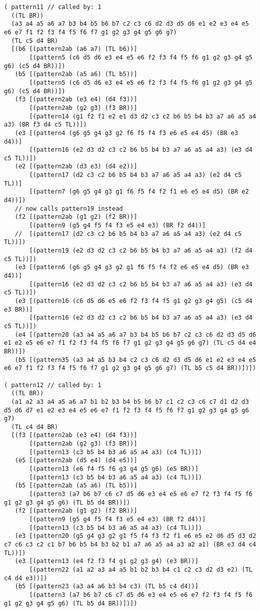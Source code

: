 {\begin{verbatim}
( pattern11 // called by: 1
  ((TL BR))
  (a3 a4 a5 a6 a7 b3 b4 b5 b6 b7 c2 c3 c6 d2 d3 d5 d6 e1 e2 e3 e4 e5 e6 e7 f1 f2 f3 f4 f5 f6 f7 g1 g2 g3 g4 g5 g6 g7)
  (TL c5 d4 BR)
  [(b6 [(pattern2ab (a6 a7) (TL b6))]
       [(pattern5 (c6 d5 d6 e3 e4 e5 e6 f2 f3 f4 f5 f6 g1 g2 g3 g4 g5 g6) (c5 d4 BR))])
   (b5 [(pattern2ab (a5 a6) (TL b5))]
       [(pattern5 (c6 d5 d6 e3 e4 e5 e6 f2 f3 f4 f5 f6 g1 g2 g3 g4 g5 g6) (c5 d4 BR))])
   (f3 [(pattern2ab (e3 e4) (d4 f3))]
       [(pattern2ab (g2 g3) (f3 BR))]
       [(pattern14 (g1 f2 f1 e2 e1 d3 d2 c3 c2 b6 b5 b4 b3 a7 a6 a5 a4 a3) (BR f3 d4 c5 TL))])
   (e3 [(pattern4 (g6 g5 g4 g3 g2 f6 f5 f4 f3 e6 e5 e4 d5) (BR e3 d4))]
       [(pattern16 (e2 d3 d2 c3 c2 b6 b5 b4 b3 a7 a6 a5 a4 a3) (e3 d4 c5 TL))])
   (e2 [(pattern2ab (d3 e3) (d4 e2))]
       [(pattern17 (d2 c3 c2 b6 b5 b4 b3 a7 a6 a5 a4 a3) (e2 d4 c5 TL))]
       [(pattern7 (g6 g5 g4 g3 g1 f6 f5 f4 f2 f1 e6 e5 e4 d5) (BR e2 d4))])
   // now calls pattern19 instead
   (f2 [(pattern2ab (g1 g2) (f2 BR))]
       [(pattern9 (g5 g4 f5 f4 f3 e5 e4 e3) (BR f2 d4))]
   //  [(pattern17 (d2 c3 c2 b6 b5 b4 b3 a7 a6 a5 a4 a3) (e2 d4 c5 TL))])
       [(pattern19 (e2 d3 d2 c3 c2 b6 b5 b4 b3 a7 a6 a5 a4 a3) (f2 d4 c5 TL))])
   (e3 [(pattern6 (g6 g5 g4 g3 g2 g1 f6 f5 f4 f2 e6 e5 e4 d5) (BR e3 d4))]
       [(pattern16 (e2 d3 d2 c3 c2 b6 b5 b4 b3 a7 a6 a5 a4 a3) (e3 d4 c5 TL))])
   (e3 [(pattern16 (c6 d5 d6 e5 e6 f2 f3 f4 f5 g1 g2 g3 g4 g5) (c5 d4 e3 BR))]
       [(pattern16 (e2 d3 d2 c3 c2 b6 b5 b4 b3 a7 a6 a5 a4 a3) (e3 d4 c5 TL))])
   (e4 [(pattern20 (a3 a4 a5 a6 a7 b3 b4 b5 b6 b7 c2 c3 c6 d2 d3 d5 d6 e1 e2 e5 e6 e7 f1 f2 f3 f4 f5 f6 f7 g1 g2 g3 g4 g5 g6 g7) (TL c5 d4 e4 BR))])
   (b5 [(pattern35 (a3 a4 a5 b3 b4 c2 c3 c6 d2 d3 d5 d6 e1 e2 e3 e4 e5 e6 e7 f1 f2 f3 f4 f5 f6 f7 g1 g2 g3 g4 g5 g6 g7) (TL b5 c5 d4 BR))])])

( pattern12 // called by: 1
  ((TL BR))
  (a1 a2 a3 a4 a5 a6 a7 b1 b2 b3 b4 b5 b6 b7 c1 c2 c3 c6 c7 d1 d2 d3 d5 d6 d7 e1 e2 e3 e4 e5 e6 e7 f1 f2 f3 f4 f5 f6 f7 g1 g2 g3 g4 g5 g6 g7)
  (TL c4 d4 BR)
  [(f3 [(pattern2ab (e3 e4) (d4 f3))]
       [(pattern2ab (g2 g3) (f3 BR))]
       [(pattern13 (c3 b5 b4 b3 a6 a5 a4 a3) (c4 TL))])
   (e5 [(pattern2ab (d5 e4) (d4 e5))]
       [(pattern13 (e6 f4 f5 f6 g3 g4 g5 g6) (e5 BR))]
       [(pattern13 (c3 b5 b4 b3 a6 a5 a4 a3) (c4 TL))])
   (b5 [(pattern2ab (a5 a6) (TL b5))]
       [(pattern3 (a7 b6 b7 c6 c7 d5 d6 e3 e4 e5 e6 e7 f2 f3 f4 f5 f6 g1 g2 g3 g4 g5 g6) (TL b5 d4 BR))])
   (f2 [(pattern2ab (g1 g2) (f2 BR))]
       [(pattern9 (g5 g4 f5 f4 f3 e5 e4 e3) (BR f2 d4))]
       [(pattern13 (c3 b5 b4 b3 a6 a5 a4 a3) (c4 TL))])
   (e3 [(pattern20 (g5 g4 g3 g2 g1 f5 f4 f3 f2 f1 e6 e5 e2 d6 d5 d3 d2 c7 c6 c3 c2 c1 b7 b6 b5 b4 b3 b2 b1 a7 a6 a5 a4 a3 a2 a1) (BR e3 d4 c4 TL))])
   (e3 [(pattern13 (e4 f2 f3 f4 g1 g2 g3 g4) (e3 BR))]
       [(pattern22 (a1 a2 a3 a4 a5 b1 b2 b3 b4 c1 c2 c3 d2 d3 e2) (TL c4 d4 e3))])
   (b5 [(pattern23 (a3 a4 a6 b3 b4 c3) (TL b5 c4 d4))]
       [(pattern3 (a7 b6 b7 c6 c7 d5 d6 e3 e4 e5 e6 e7 f2 f3 f4 f5 f6 g1 g2 g3 g4 g5 g6) (TL b5 d4 BR))])])


\end{verbatim}}

